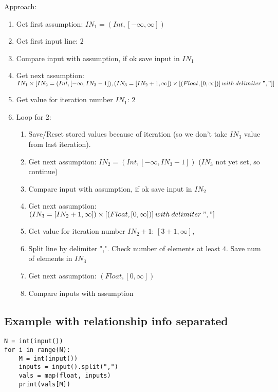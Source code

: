 \documentclass[11pt]{article}
\begin{document}
Approach:
\begin{enumerate}
  \item Get first assumption: $IN_1 = (Int, [-\infty, \infty])$
  \item Get first input line: $2$
  \item Compare input with assumption, if ok save input in $IN_1$
  \item Get next assumption: $IN_1 \times [IN_2 = (Int, [-\infty, IN_3-1]), (IN_3 = [IN_2+1, \infty]) \times [(Float, [0, \infty])] \:with\:delimiter\:","]]$
  \item Get value for iteration number $IN_1$: $2$
  \item Loop for 2:
  \begin{enumerate}
    \item Save/Reset stored values because of iteration (so we don't take $IN_3$ value from last iteration).
    \item Get next assumption: $IN_2 = (Int, [-\infty, IN_3-1])$ ($IN_3$ not yet set, so continue)
    \item Compare input with assumption, if ok save input in $IN_2$
    \item Get next assumption: $(IN_3 = [IN_2+1, \infty]) \times [(Float, [0, \infty])] \:with\:delimiter\:","]$
    \item Get value for iteration number $IN_2+1$: $[3+1, \infty]$,
    \item Split line by delimiter ",". Check number of elements at least $4$. Save num of elements in $IN_3$
    \item Get next assumption: $(Float, [0, \infty])$
    \item Compare inputs with assumption
  \end{enumerate}
\end{enumerate}

\subsection{Example with relationship info separated}

\begin{lstlisting}
N = int(input())
for i in range(N):
    M = int(input())
    inputs = input().split(",")
    vals = map(float, inputs)
    print(vals[M])
\end{lstlisting}
\end{document}
